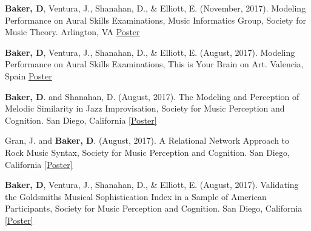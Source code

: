


\textbf{Baker, D}, Ventura, J., Shanahan, D., \& Elliott, E. (November, 2017). Modeling Performance on Aural Skills Examinations, Music Informatics Group, Society for Music Theory. Arlington, VA \href{https://musiccog.lsu.edu/lab_posters/modeling-performance-aural.pdf}{Poster}

\textbf{Baker, D}, Ventura, J., Shanahan, D., \& Elliott, E. (August, 2017). Modeling Performance on Aural Skills Examinations, This is Your Brain on Art. Valencia, Spain \href{https://musiccog.lsu.edu/lab_posters/modeling-performance-aural.pdf}{Poster}

\textbf{Baker, D}. and Shanahan, D. (August, 2017). The Modeling and Perception of Melodic Similarity in Jazz Improvisation, Society for Music Perception and Cognition. San Diego, California \href{https://musiccog.lsu.edu/davidjohnbaker/modeling-perception-melodic.pdf}{[Poster]}

Gran, J. and \textbf{Baker, D}. (August, 2017). A Relational Network Approach to Rock Music Syntax, Society for Music Perception and Cognition. San Diego, California \href{https://musiccog.lsu.edu/davidjohnbaker/relational-network-approach-FINAL.pdf}{[Poster]}

\textbf{Baker, D}, Ventura, J., Shanahan, D., \& Elliott, E. (August, 2017). Validating the Goldsmiths Musical Sophistication Index in a Sample of American Participants, Society for Music Perception and Cognition. San Diego, California \href{https://musiccog.lsu.edu/davidjohnbaker/goldsmiths-FINAL-Baker.pdf}{[Poster]} 

